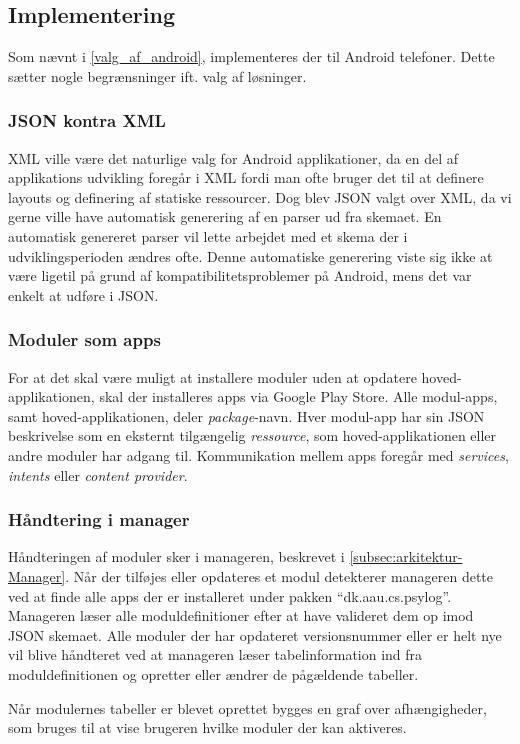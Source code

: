 \subsection{Implementering}
Som nævnt i \cref{valg_af_android}, implementeres der til Android telefoner.
Dette sætter nogle begrænsninger ift. valg af løsninger.

\subsubsection{JSON kontra XML}
XML ville være det naturlige valg for Android applikationer, da en del af applikations udvikling foregår i XML fordi man ofte bruger det til at definere layouts og definering af statiske ressourcer. 
Dog blev JSON valgt over XML, da vi gerne ville have automatisk generering af en parser ud fra skemaet.
En automatisk genereret parser vil lette arbejdet med et skema der i udviklingsperioden ændres ofte.
Denne automatiske generering viste sig ikke at være ligetil på grund af kompatibilitetsproblemer på Android, mens det var enkelt at udføre i JSON.

\subsubsection{Moduler som apps}
For at det skal være muligt at installere moduler uden at opdatere hoved-applikationen, skal der installeres apps via Google Play Store.
Alle modul-apps, samt hoved-applikationen, deler \textit{package}-navn.
Hver modul-app har sin JSON beskrivelse som en eksternt tilgængelig \textit{ressource}, som hoved-applikationen eller andre moduler har adgang til.
Kommunikation mellem apps foregår med \textit{services}, \textit{intents} eller \textit{content provider}.

\subsubsection{Håndtering i manager}
Håndteringen af moduler sker i manageren, beskrevet i \cref{subsec:arkitektur-Manager}.
Når der tilføjes eller opdateres et modul detekterer manageren dette ved at finde alle apps der er installeret under pakken ``dk.aau.cs.psylog''.
Manageren læser alle moduldefinitioner efter at have valideret dem op imod JSON skemaet.
Alle moduler der har opdateret versionsnummer eller er helt nye vil blive håndteret ved at manageren læser tabelinformation ind fra moduldefinitionen og opretter eller ændrer de pågældende tabeller.

Når modulernes tabeller er blevet oprettet bygges en graf over afhængigheder, som bruges til at vise brugeren hvilke moduler der kan aktiveres.
